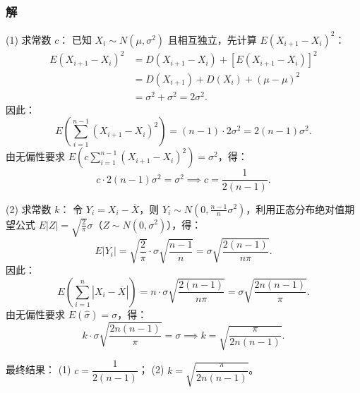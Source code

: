 \documentclass[11pt,a4paper,oneside,openany]{book}
\theoremstyle{yhbthm}
\begin{document}
\subsubsection{解}
(1) 求常数 $c$：
已知 $X_i \sim N(\mu, \sigma^2)$ 且相互独立，先计算 $E(X_{i+1}-X_i)^2$：
\[
\begin{aligned}
E(X_{i+1}-X_i)^2 &= D(X_{i+1}-X_i) + [E(X_{i+1}-X_i)]^2 \\
&= D(X_{i+1}) + D(X_i) + (\mu - \mu)^2 \\
&= \sigma^2 + \sigma^2 = 2\sigma^2.
\end{aligned}
\]
因此：
\[
E\left(\sum_{i=1}^{n-1} (X_{i+1}-X_i)^2\right) = (n-1) \cdot 2\sigma^2 = 2(n-1)\sigma^2.
\]
由无偏性要求 $E\left(c\sum_{i=1}^{n-1} (X_{i+1}-X_i)^2\right) = \sigma^2$，得：
\[
c \cdot 2(n-1)\sigma^2 = \sigma^2 \implies c = \frac{1}{2(n-1)}.
\]

(2) 求常数 $k$：
令 $Y_i = X_i - \overline{X}$，则 $Y_i \sim N\left(0, \frac{n-1}{n}\sigma^2\right)$，利用正态分布绝对值期望公式 $E|Z| = \sqrt{\frac{2}{\pi}}\sigma$（$Z \sim N(0,\sigma^2)$），得：
\[
E|Y_i| = \sqrt{\frac{2}{\pi}} \cdot \sigma \sqrt{\frac{n-1}{n}} = \sigma \sqrt{\frac{2(n-1)}{n\pi}}.
\]
因此：
\[
E\left(\sum_{i=1}^n |X_i - \overline{X}|\right) = n \cdot \sigma \sqrt{\frac{2(n-1)}{n\pi}} = \sigma \sqrt{\frac{2n(n-1)}{\pi}}.
\]
由无偏性要求 $E(\hat{\sigma}) = \sigma$，得：
\[
k \cdot \sigma \sqrt{\frac{2n(n-1)}{\pi}} = \sigma \implies k = \sqrt{\frac{\pi}{2n(n-1)}}.
\]

最终结果：
(1) $\boxed{c = \dfrac{1}{2(n-1)}}$；
(2) $\boxed{k = \sqrt{\dfrac{\pi}{2n(n-1)}}}$。
\end{document}
